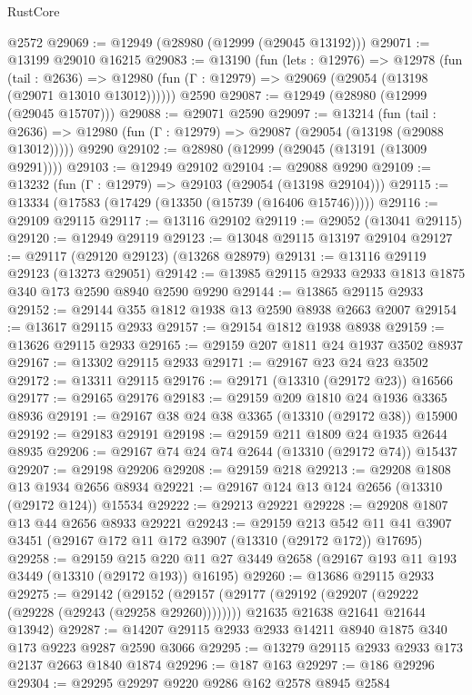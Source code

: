 \begin{lexlean}{RustCore}
\begin{coremodule}
    @2572
@29069 := @12949 (@28980 (@12999 (@29045 @13192)))
@29071 := @13199 @29010 @16215
@29083 := @13190
    (fun (lets : @12976) =>
    @12978
      (fun (tail : @2636) =>
      @12980 (fun (Γ : @12979) => @29069 (@29054 (@13198 (@29071 @13010 @13012))))))
    @2590
@29087 := @12949 (@28980 (@12999 (@29045 @15707)))
@29088 := @29071 @2590
@29097 := @13214
    (fun (tail : @2636) => @12980 (fun (Γ : @12979) => @29087 (@29054 (@13198 (@29088 @13012)))))
    @9290
@29102 := @28980 (@12999 (@29045 (@13191 (@13009 @9291))))
@29103 := @12949 @29102
@29104 := @29088 @9290
@29109 := @13232 (fun (Γ : @12979) => @29103 (@29054 (@13198 @29104)))
@29115 := @13334 (@17583 (@17429 (@13350 (@15739 (@16406 @15746)))))
@29116 := @29109 @29115
@29117 := @13116 @29102
@29119 := @29052 (@13041 @29115)
@29120 := @12949 @29119
@29123 := @13048 @29115 @13197 @29104
@29127 := @29117 (@29120 @29123) (@13268 @28979)
@29131 := @13116 @29119 @29123 (@13273 @29051)
@29142 := @13985 @29115 @2933 @2933 @1813 @1875 @340 @173 @2590 @8940 @2590 @9290
@29144 := @13865 @29115 @2933
@29152 := @29144 @355 @1812 @1938 @13 @2590 @8938 @2663 @2007
@29154 := @13617 @29115 @2933
@29157 := @29154 @1812 @1938 @8938
@29159 := @13626 @29115 @2933
@29165 := @29159 @207 @1811 @24 @1937 @3502 @8937
@29167 := @13302 @29115 @2933
@29171 := @29167 @23 @24 @23 @3502
@29172 := @13311 @29115
@29176 := @29171 (@13310 (@29172 @23)) @16566
@29177 := @29165 @29176
@29183 := @29159 @209 @1810 @24 @1936 @3365 @8936
@29191 := @29167 @38 @24 @38 @3365 (@13310 (@29172 @38)) @15900
@29192 := @29183 @29191
@29198 := @29159 @211 @1809 @24 @1935 @2644 @8935
@29206 := @29167 @74 @24 @74 @2644 (@13310 (@29172 @74)) @15437
@29207 := @29198 @29206
@29208 := @29159 @218
@29213 := @29208 @1808 @13 @1934 @2656 @8934
@29221 := @29167 @124 @13 @124 @2656 (@13310 (@29172 @124)) @15534
@29222 := @29213 @29221
@29228 := @29208 @1807 @13 @44 @2656 @8933 @29221
@29243 := @29159
    @213
    @542
    @11
    @41
    @3907
    @3451
    (@29167 @172 @11 @172 @3907 (@13310 (@29172 @172)) @17695)
@29258 := @29159
    @215
    @220
    @11
    @27
    @3449
    @2658
    (@29167 @193 @11 @193 @3449 (@13310 (@29172 @193)) @16195)
@29260 := @13686 @29115 @2933
@29275 := @29142
    (@29152
      (@29157 (@29177 (@29192 (@29207 (@29222 (@29228 (@29243 (@29258 @29260))))))))
      @21635
      @21638
      @21641
      @21644
      @13942)
@29287 := @14207 @29115 @2933 @2933 @14211 @8940 @1875 @340 @173 @9223 @9287 @2590 @3066
@29295 := @13279 @29115 @2933 @2933 @173 @2137 @2663 @1840 @1874
@29296 := @187 @163
@29297 := @186 @29296
@29304 := @29295 @29297 @9220 @9286 @162 @2578 @8945 @2584

\end{coremodule}
\end{lexlean}
